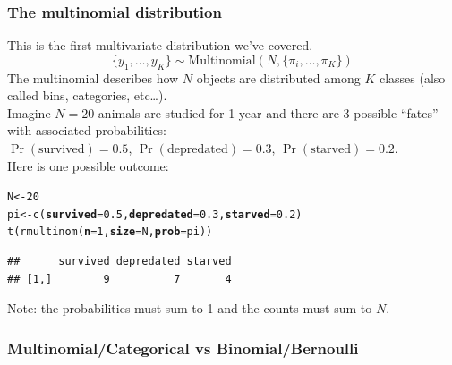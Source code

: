 \documentclass[color=usenames,dvipsnames]{beamer}\usepackage[]{graphicx}\usepackage[]{color}
\makeatletter
\newcommand{\hlnum}[1]{\textcolor[rgb]{0.69,0.494,0}{#1}}%
\newcommand{\hlstd}[1]{\textcolor[rgb]{0,0,0}{#1}}%
\newcommand{\hlkwb}[1]{\textcolor[rgb]{0,0.341,0.682}{#1}}%
\newcommand{\hlkwc}[1]{\textcolor[rgb]{0,0,0}{\textbf{#1}}}%
\newcommand{\hlkwd}[1]{\textcolor[rgb]{0.004,0.004,0.506}{#1}}%
\newenvironment{kframe}{%
 \def\at@end@of@kframe{}%
 \ifinner\ifhmode%
  \def\at@end@of@kframe{\end{minipage}}%
  \begin{minipage}{\columnwidth}%
 \fi\fi%
 \def\FrameCommand##1{\hskip\@totalleftmargin \hskip-\fboxsep
 \colorbox{shadecolor}{##1}\hskip-\fboxsep
     \hskip-\linewidth \hskip-\@totalleftmargin \hskip\columnwidth}%
 \MakeFramed {\advance\hsize-\width
   \@totalleftmargin\z@ \linewidth\hsize
   \@setminipage}}%
 {\par\unskip\endMakeFramed%
 \at@end@of@kframe}
\newenvironment{knitrout}{}{} %
\makeatother
\begin{document}
\begin{frame}[fragile]
  \frametitle{The multinomial distribution}
  \small
  This is the first multivariate distribution we've covered. \\
  \[
    \{y_{1}, \dots, y_{K}\}  \sim \mathrm{Multinomial}(N, \{\pi_i, \dots, \pi_K\})
  \]
  \pause
  The multinomial describes how $N$ objects are distributed among
  $K$ classes (also called bins, categories, etc\dots). \\
  \pause
  \vfill
  Imagine $N=20$ animals are studied for 1 year and there are 3
  possible ``fates'' with associated probabilities: \\
  $\Pr(\mathrm{survived})=0.5$, $\Pr(\mathrm{depredated})=0.3$, $\Pr(\mathrm{starved})=0.2$. \\
  \pause
  \vfill
  Here is one possible outcome:
  \vspace{-6pt}
\begin{knitrout}\footnotesize
{}\color{fgcolor}\begin{kframe}
\begin{alltt}
\hlstd{N} \hlkwb{<-} \hlnum{20}
\hlstd{pi} \hlkwb{<-} \hlkwd{c}\hlstd{(}\hlkwc{survived}\hlstd{=}\hlnum{0.5}\hlstd{,} \hlkwc{depredated}\hlstd{=}\hlnum{0.3}\hlstd{,} \hlkwc{starved}\hlstd{=}\hlnum{0.2}\hlstd{)}
\hlkwd{t}\hlstd{(}\hlkwd{rmultinom}\hlstd{(}\hlkwc{n}\hlstd{=}\hlnum{1}\hlstd{,} \hlkwc{size}\hlstd{=N,} \hlkwc{prob}\hlstd{=pi))}
\end{alltt}
\begin{verbatim}
##      survived depredated starved
## [1,]        9          7       4
\end{verbatim}
\end{kframe}
\end{knitrout}
  \pause
  \centering
  Note: the probabilities must sum to 1 and the counts must sum to $N$. \\
\end{frame}



\begin{frame}[fragile]
  \frametitle{\normalsize Multinomial/Categorical vs Binomial/Bernoulli}
  \centering
   \\
\end{frame}
\end{document}
